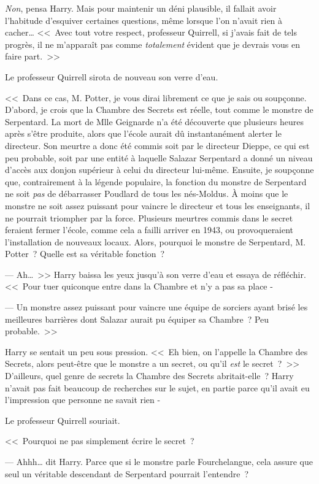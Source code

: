 \emph{Non}, pensa Harry. Mais pour maintenir un déni plausible, il fallait avoir l'habitude d'esquiver certaines questions, même lorsque l'on n'avait rien à cacher… <<~Avec tout votre respect, professeur Quirrell, si j'avais fait de tels progrès, il ne m'apparaît pas comme \emph{totalement} évident que je devrais vous en faire part.~>>

Le professeur Quirrell sirota de nouveau son verre d'eau.

<<~Dans ce cas, M. Potter, je vous dirai librement ce que je sais ou soupçonne. D'abord, je crois que la Chambre des Secrets est réelle, tout comme le monstre de Serpentard. La mort de Mlle Geignarde n'a été découverte que plusieurs heures après s'être produite, alors que l'école aurait dû instantanément alerter le directeur. Son meurtre a donc été commis soit par le directeur Dieppe, ce qui est peu probable, soit par une entité à laquelle Salazar Serpentard a donné un niveau d'accès aux donjon supérieur à celui du directeur lui-même. Ensuite, je soupçonne que, contrairement à la légende populaire, la fonction du monstre de Serpentard ne soit \emph{pas} de débarrasser Poudlard de tous les nés-Moldus. À moins que le monstre ne soit assez puissant pour vaincre le directeur et tous les enseignants, il ne pourrait triompher par la force. Plusieurs meurtres commis dans le secret feraient fermer l'école, comme cela a failli arriver en 1943, ou provoqueraient l'installation de nouveaux locaux. Alors, pourquoi le monstre de Serpentard, M. Potter~? Quelle est sa véritable fonction~?

--- Ah…~>> Harry baissa les yeux jusqu'à son verre d'eau et essaya de réfléchir. <<~Pour tuer quiconque entre dans la Chambre et n'y a pas sa place -

--- Un monstre assez puissant pour vaincre une équipe de sorciers ayant brisé les meilleures barrières dont Salazar aurait pu équiper sa Chambre~? Peu probable.~>>

Harry se sentait un peu sous pression. <<~Eh bien, on l'appelle la Chambre des Secrets, alors peut-être que le monstre a un secret, ou qu'il \emph{est} le secret~?~>> D'ailleurs, quel genre de secrets la Chambre des Secrets abritait-elle~? Harry n'avait pas fait beaucoup de recherches sur le sujet, en partie parce qu'il avait eu l'impression que personne ne savait rien -

Le professeur Quirrell souriait.

<<~Pourquoi ne pas simplement écrire le secret~?

--- Ahhh… dit Harry. Parce que si le monstre parle Fourchelangue, cela assure que seul un véritable descendant de Serpentard pourrait l'entendre~?

